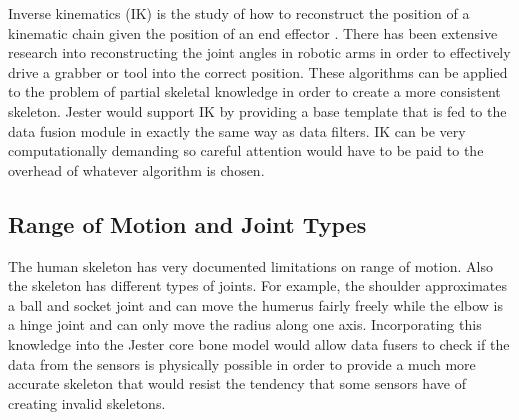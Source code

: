 Inverse kinematics (IK) is the study of how to reconstruct the position of a kinematic chain given the position of an end effector \cite{tolani2000real}. There has been extensive research into reconstructing the joint angles in robotic arms in order to effectively drive a grabber or tool into the correct position. These algorithms can be applied to the problem of partial skeletal knowledge in order to create a more consistent skeleton. Jester would support IK by providing a base template that is fed to the data fusion module in exactly the same way as data filters. IK can be very computationally demanding so careful attention would have to be paid to the overhead of whatever algorithm is chosen.

\subsection{Range of Motion and Joint Types}

The human skeleton has very documented limitations on range of motion. Also the skeleton has different types of joints. For example, the shoulder approximates a ball and socket joint and can move the humerus fairly freely while the elbow is a hinge joint and can only move the radius along one axis. Incorporating this knowledge into the Jester core bone model would allow data fusers to check if the data from the sensors is physically possible in order to provide a much more accurate skeleton that would resist the tendency that some sensors have of creating invalid skeletons.
